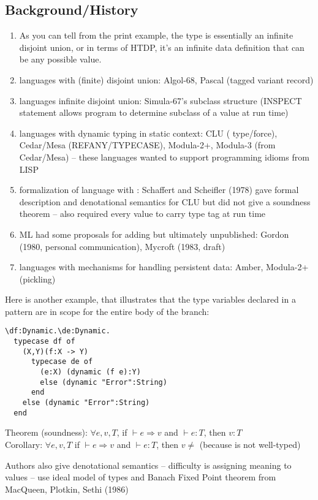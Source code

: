 \documentclass[12pt]{article}	%
\begin{document}
\subsection*{Background/History}
\begin{enumerate}
	\item As you can tell from the print example, the type \Dynamic is essentially an infinite disjoint union, or in terms of HTDP, it's an infinite data definition that can be any possible value.
	\item languages with (finite) disjoint union: Algol-68, Pascal (tagged variant record)
	\item languages infinite disjoint union: Simula-67's subclass structure (INSPECT statement allows program to determine subclass of a value at run time)
	\item languages with dynamic typing in static context: CLU ( type/force), Cedar/Mesa (REFANY/TYPECASE), Modula-2+, Modula-3 (from Cedar/Mesa) -- these languages wanted to support programming idioms from LISP
	\item formalization of language with \Dynamic: Schaffert and Scheifler (1978) gave formal description and denotational semantics for CLU but did not give a soundness theorem -- also required every value to carry type tag at run time
	\item ML had some proposals for adding \Dynamic but ultimately unpublished: Gordon (1980, personal communication), Mycroft (1983, draft)
	\item languages with mechanisms for handling persistent data: Amber, Modula-2+ (pickling)
\end{enumerate}

Here is another example, that illustrates that the type variables declared in a pattern are in scope for the entire body of the branch:
\begin{verbatim}
\df:Dynamic.\de:Dynamic.
  typecase df of
    (X,Y)(f:X -> Y)
      typecase de of
        (e:X) (dynamic (f e):Y)
        else (dynamic "Error":String)
      end
    else (dynamic "Error":String)
  end
\end{verbatim}

Theorem (soundness): $\forall e, v, T$, if $\vdash e \Rightarrow v$ and $\vdash e:T$, then $v:T$\\
	      Corollary: $\forall e, v, T$ if $\vdash e \Rightarrow v$ and $\vdash e:T$, then $v \neq$ \wrong (because \wrong is not well-typed)

Authors also give denotational semantics -- difficulty is assigning meaning to \Dynamic values -- use ideal model of types and Banach Fixed Point theorem from MacQueen, Plotkin, Sethi (1986)
\end{document}
